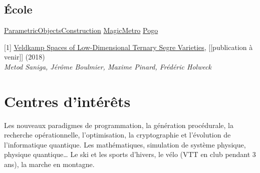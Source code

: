 \documentclass[10pt,sans]{moderncv}
\begin{document}
		\subsection{École}
				{\href{https://github.com/pinam45/UTBM\_IN55\_ParametricObjectsConstruction}{ParametricObjectsConstruction}}
				{\href{https://github.com/TiWinDeTea/MagicMetro}{MagicMetro}}
				{\href{https://github.com/pinam45/UTBM_IA41_Pogo}{Pogo}}


	\vspace*{\deletedSpace}
	\begin{thebibliography}{}
		[1] \href{https://arxiv.org/abs/1806.08965}{Veldkamp Spaces of Low-Dimensional Ternary Segre Varieties}, [[publication à venir]] (2018)\\
		\textit{Metod Saniga, Jérôme Boulmier, Maxime Pinard, Frédéric Holweck}
	\end{thebibliography}


	\vspace*{\deletedSpace}
	\section{Centres d'intérêts}
			{Les nouveaux paradigmes de programmation, la génération procédurale, la recherche opérationnelle, l'optimisation, la cryptographie et l'évolution de l'informatique quantique.}
			{Les mathématiques, simulation de système physique, physique quantique\ldots}
			{Le ski et les sports d'hivers, le vélo (VTT en club pendant 3 ans), la marche en montagne.}
\end{document}
